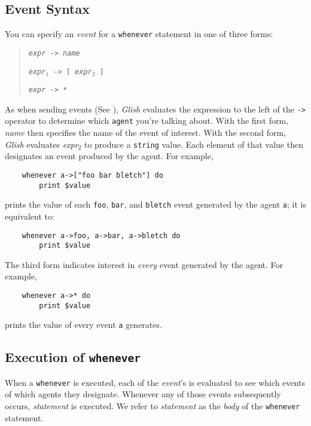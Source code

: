 \subsection{Event Syntax}
\label{event-syntax}

You can specify an {\em event} for a {\tt whenever} statement in
one of three forms:
\begin{quote}
    {\tt {\em expr} -> {\em name}}

    {\tt {\em expr$_1$} -> [ {\em expr$_2$} ] }

    {\tt {\em expr} -> * }
\end{quote}
As when sending events (See ), {\em Glish} evaluates the
expression to the left of the \verb+->+ operator to determine which
{\tt agent} you're talking about. 
With the first form, {\em name} then specifies the name of the event
of interest. With the second form, {\em Glish} evaluates {\em expr$_2$} to
produce a {\tt string} value. Each element of 
that value then designates an
event produced by the agent.  For example,
\begin{verbatim}
    whenever a->["foo bar bletch"] do
        print $value
\end{verbatim}
prints the value of each {\tt foo}, {\tt bar}, and {\tt bletch}
event generated by the agent {\tt a}; it is equivalent to:
\begin{verbatim}
    whenever a->foo, a->bar, a->bletch do
        print $value
\end{verbatim}
The third form indicates interest in {\em every} event generated by
the agent.  For example,
\begin{verbatim}
    whenever a->* do
        print $value
\end{verbatim}
prints the value of every event {\tt a} generates.

\subsection{Execution of {\tt whenever}}

When a {\tt whenever} is executed, each of the {\em event\/}'s is
evaluated to see which events of which agents they designate.  Whenever
any of those events subsequently occurs, {\em statement} is executed.
We refer to {\em statement} as the {\em body} of the {\tt whenever} statement.


